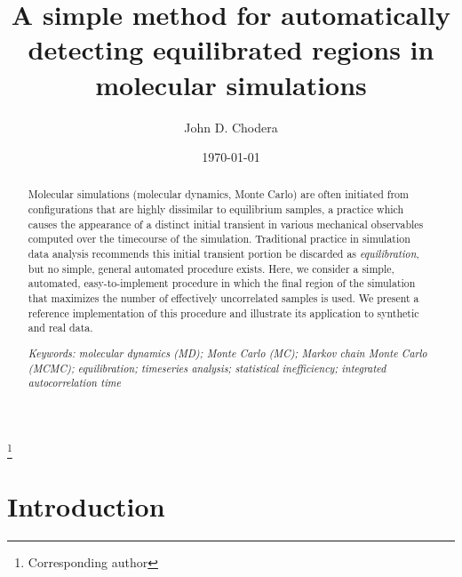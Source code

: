 \documentclass[aps,pre,twocolumn,nofootinbib,superscriptaddress,linenumbers]{revtex4-1}
\begin{document}
\title{A simple method for automatically detecting equilibrated regions in molecular simulations}

\author{John D. Chodera}
 \thanks{Corresponding author}

\date{\today}

\begin{abstract}
Molecular simulations (molecular dynamics, Monte Carlo) are often initiated from configurations that are highly dissimilar to equilibrium samples, a practice which causes the appearance of a distinct initial transient in various mechanical observables computed over the timecourse of the simulation.
Traditional practice in simulation data analysis recommends this initial transient portion be discarded as \emph{equilibration}, but no simple, general automated procedure exists.
Here, we consider a simple, automated, easy-to-implement procedure in which the final region of the simulation that maximizes the number of effectively uncorrelated samples is used.
We present a reference implementation of this procedure and illustrate its application to synthetic and real data.

\emph{Keywords: molecular dynamics (MD); Monte Carlo (MC); Markov chain Monte Carlo (MCMC); equilibration; timeseries analysis; statistical inefficiency; integrated autocorrelation time}
\end{abstract}

\maketitle

\section{Introduction}
\label{section:introduction}
\end{document}
